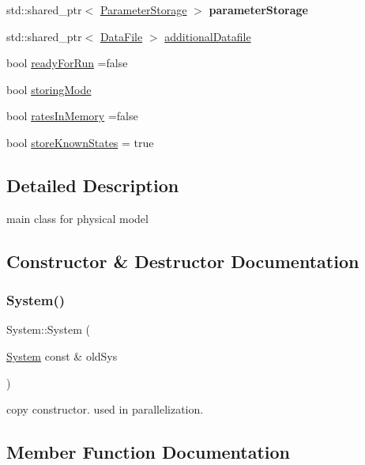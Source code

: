 \begin{DoxyCompactItemize}
std\+::shared\+\_\+ptr$<$ \hyperlink{classParameterStorage}{Parameter\+Storage} $>$ {\bfseries parameter\+Storage}
\item 
std\+::shared\+\_\+ptr$<$ \hyperlink{classDataFile}{Data\+File} $>$ \hyperlink{classSystem_a93078f871a37d1a87c188802f7f78f24}{additional\+Datafile}
\item 
bool \hyperlink{classSystem_a0d59e20f6ebffb9b2b6e31f7e85d1756}{ready\+For\+Run} =false
\item 
bool \hyperlink{classSystem_afe51eb9409a63748242e0a987c98caf0}{storing\+Mode}
\item 
bool \hyperlink{classSystem_abdb9c2321ac8dbfc6a5febc07ae4def9}{rates\+In\+Memory} =false
\item 
bool \hyperlink{classSystem_aa121c1c34382800d39106aa81d9c36f4}{store\+Known\+States} = true
\end{DoxyCompactItemize}


\subsection{Detailed Description}
main class for physical model 

\subsection{Constructor \& Destructor Documentation}
\mbox{\label{classSystem_afe81cf1082ba164e244acfb72735b753}} 
\subsubsection{\texorpdfstring{System()}{System()}}
{\footnotesize\ttfamily System\+::\+System (\begin{DoxyParamCaption}\item[{\hyperlink{classSystem}{System} const \&}]{old\+Sys }\end{DoxyParamCaption})}

copy constructor. used in parallelization. 

\subsection{Member Function Documentation}
\mbox{\label{classSystem_a5ce3d5c7024ac817ab218b65d96ed1eb}} 
